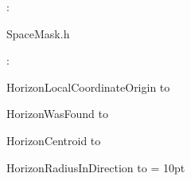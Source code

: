 


\vspace{5mm}

: 

SpaceMask.h
\vspace{2mm}

: 



HorizonLocalCoordinateOrigin to 

HorizonWasFound to 

HorizonCentroid to 

HorizonRadiusInDirection to 
\vspace{2mm}\parskip = 10pt 
